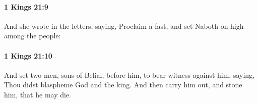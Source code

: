 		\paragraph{1 Kings 21:9} %
			\label{1KINGS-21-9}

			And she wrote in the letters, saying, Proclaim a fast, and set Naboth on high among the people:


		\paragraph{1 Kings 21:10} %
			\label{1KINGS-21-10}

			And set two men, sons of Belial, before him, to bear witness against him, saying, Thou didst blaspheme God and the king. And then carry him out, and stone him, that he may die.


